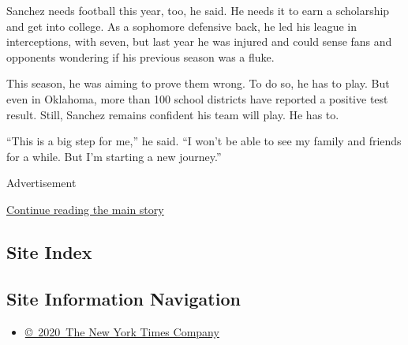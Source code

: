 Sanchez needs football this year, too, he said. He needs it to earn a
scholarship and get into college. As a sophomore defensive back, he led
his league in interceptions, with seven, but last year he was injured
and could sense fans and opponents wondering if his previous season was
a fluke.

This season, he was aiming to prove them wrong. To do so, he has to
play. But even in Oklahoma, more than 100 school districts have reported
a positive test result. Still, Sanchez remains confident his team will
play. He has to.

``This is a big step for me,'' he said. ``I won't be able to see my
family and friends for a while. But I'm starting a new journey.''

Advertisement

\protect\hyperlink{after-bottom}{Continue reading the main story}

\hypertarget{site-index}{%
\subsection{Site Index}\label{site-index}}

\hypertarget{site-information-navigation}{%
\subsection{Site Information
Navigation}\label{site-information-navigation}}

\begin{itemize}
\tightlist
\item
  \href{https://help.nytimes3xbfgragh.onion/hc/en-us/articles/115014792127-Copyright-notice}{©~2020~The
  New York Times Company}
\end{itemize}


